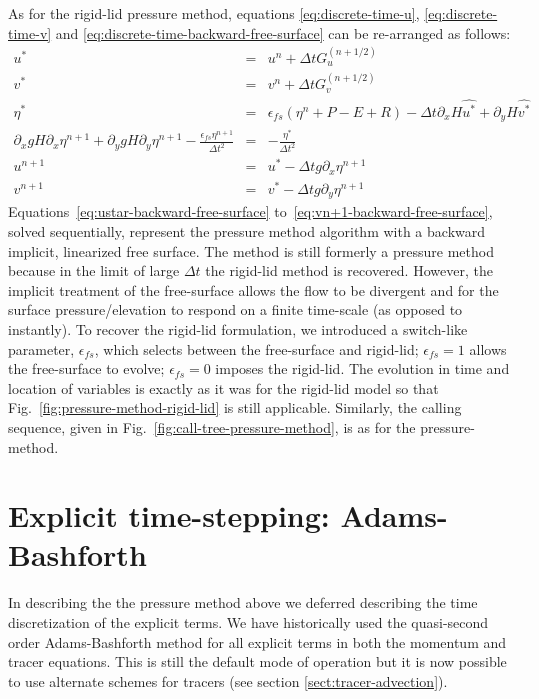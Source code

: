 As for the rigid-lid pressure method, equations
\ref{eq:discrete-time-u}, \ref{eq:discrete-time-v} and
\ref{eq:discrete-time-backward-free-surface} can be re-arranged as follows:
\begin{eqnarray}
u^{*} & = & u^{n} + \Delta t G_u^{(n+1/2)} \label{eq:ustar-backward-free-surface} \\
v^{*} & = & v^{n} + \Delta t G_v^{(n+1/2)} \label{eq:vstar-backward-free-surface} \\
\eta^* & = & \epsilon_{fs} \left( \eta^{n} +P-E+R \right)- \Delta t 
  \partial_x H \widehat{u^{*}}
+ \partial_y H \widehat{v^{*}}
\\
  \partial_x g H \partial_x \eta^{n+1}
+ \partial_y g H \partial_y \eta^{n+1}
- \frac{\epsilon_{fs} \eta^{n+1}}{\Delta t^2}
& = &
- \frac{\eta^*}{\Delta t^2}
\label{eq:elliptic-backward-free-surface}
\\
u^{n+1} & = & u^{*} - \Delta t g \partial_x \eta^{n+1} \label{eq:un+1-backward-free-surface}\\
v^{n+1} & = & v^{*} - \Delta t g \partial_y \eta^{n+1} \label{eq:vn+1-backward-free-surface}
\end{eqnarray}
Equations~\ref{eq:ustar-backward-free-surface}
to~\ref{eq:vn+1-backward-free-surface}, solved sequentially, represent
the pressure method algorithm with a backward implicit, linearized
free surface. The method is still formerly a pressure method because
in the limit of large $\Delta t$ the rigid-lid method is
recovered. However, the implicit treatment of the free-surface allows
the flow to be divergent and for the surface pressure/elevation to
respond on a finite time-scale (as opposed to instantly). To recover
the rigid-lid formulation, we introduced a switch-like parameter,
$\epsilon_{fs}$, which selects between the free-surface and rigid-lid;
$\epsilon_{fs}=1$ allows the free-surface to evolve; $\epsilon_{fs}=0$
imposes the rigid-lid. The evolution in time and location of variables
is exactly as it was for the rigid-lid model so that
Fig.~\ref{fig:pressure-method-rigid-lid} is still
applicable. Similarly, the calling sequence, given in
Fig.~\ref{fig:call-tree-pressure-method}, is as for the
pressure-method.


\section{Explicit time-stepping: Adams-Bashforth}
\label{sect:adams-bashforth}

In describing the the pressure method above we deferred describing the
time discretization of the explicit terms. We have historically used
the quasi-second order Adams-Bashforth method for all explicit terms
in both the momentum and tracer equations. This is still the default
mode of operation but it is now possible to use alternate schemes for
tracers (see section \ref{sect:tracer-advection}).

